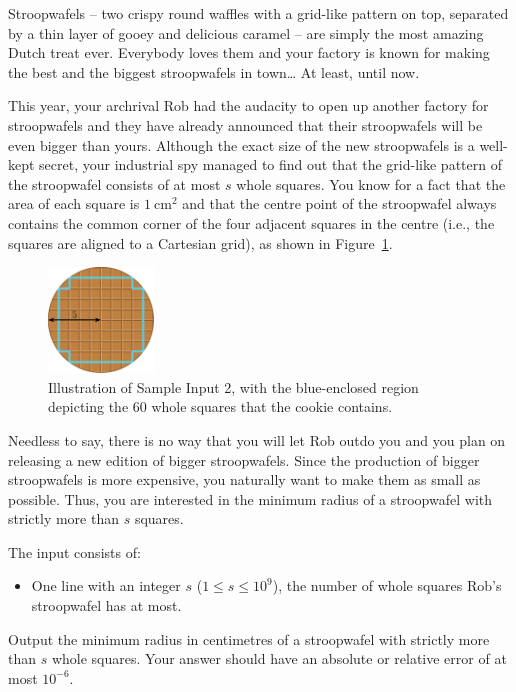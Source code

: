 
\newcommand{\maxs}{10^9}

Stroopwafels -- two crispy round waffles with a grid-like pattern on top, separated by a thin layer of gooey and delicious caramel -- are simply the most amazing Dutch treat ever.
Everybody loves them and your factory is known for making the best and the biggest stroopwafels in town\dots{} At least, until now.

This year, your archrival Rob had the audacity to open up another factory for stroopwafels and they have already announced that their stroopwafels will be even bigger than yours.
Although the exact size of the new stroopwafels is a well-kept secret, your industrial spy managed to find out that the grid-like pattern of the stroopwafel consists of at most $s$ whole squares.
You know for a fact that the area of each square is $1~\text{cm}^2$ and that the
centre point of the stroopwafel always contains the common corner of the four
adjacent squares in the centre (i.e., the squares are aligned to a Cartesian
grid), as shown in Figure~\ref{fig:c}.

\begin{figure}[h]
	\centering
	\includegraphics[width=0.25\textwidth]{sample}
	\caption{Illustration of Sample Input 2, with the blue-enclosed region depicting
	the $60$ whole squares that the cookie contains.}
    \label{fig:c}
\end{figure}

Needless to say, there is no way that you will let Rob outdo you and you plan on releasing a new edition of bigger stroopwafels.
Since the production of bigger stroopwafels is more expensive, you naturally want to make them as small as possible.
Thus, you are interested in the minimum radius of a stroopwafel with strictly more than $s$ squares.

\begin{Input}
    The input consists of:
    \begin{itemize}
        \item One line with an integer $s$ ($1\leq s\leq\maxs$), the number of whole squares Rob's stroopwafel has at most.
    \end{itemize}
\end{Input}

\begin{Output}
    Output the minimum radius in centimetres of a stroopwafel with strictly more than $s$ whole squares.
    Your answer should have an absolute or relative error of at most $10^{-6}$.
\end{Output}
